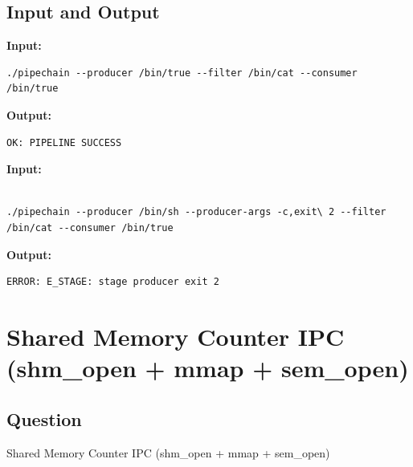 \documentclass[12pt,a4paper]{article}
\begin{document}
\subsection{Input and Output}
\noindent\textbf{Input:}
\begin{verbatim}
./pipechain --producer /bin/true --filter /bin/cat --consumer /bin/true

\end{verbatim}
\vspace{0.5cm}
\noindent\textbf{Output:}
\begin{verbatim}
OK: PIPELINE SUCCESS

\end{verbatim}
\noindent\textbf{Input:}
\begin{lstlisting}[breaklines=true, breakatwhitespace=false, frame=none, backgroundcolor={}, numbers=none, xleftmargin=0pt, columns=fullflexible]

./pipechain --producer /bin/sh --producer-args -c,exit\ 2 --filter /bin/cat --consumer /bin/true
\end{lstlisting}
\vspace{0.5cm}
\noindent\textbf{Output:}
\begin{verbatim}
ERROR: E_STAGE: stage producer exit 2

\end{verbatim}
\newpage

\section{Shared Memory Counter IPC (shm\_open + mmap + sem\_open)}
\subsection{Question}
Shared Memory Counter IPC (shm\_open + mmap + sem\_open)
\end{document}
